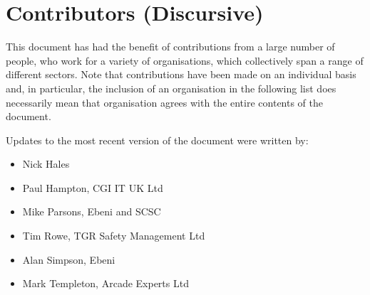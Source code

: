 %
%
\section{Contributors (Discursive)} \label{bkm:contributors}


This document has had the benefit of contributions from a large number of people, who work for a variety of organisations, which collectively span a range of different sectors. Note that contributions  have been made on an individual basis and, in particular, the inclusion of an organisation in the following list does  necessarily mean that organisation agrees with the entire contents of the document.

Updates to the most recent version of the document were written by:
\begin{itemize}
  \item Nick Hales
  \item Paul Hampton, CGI IT UK Ltd
  \item \cbstart Mike Parsons, Ebeni and SCSC
  \item Tim Rowe, TGR Safety Management Ltd
  \item Alan Simpson, Ebeni\cbend
  \item Mark Templeton, Arcade Experts Ltd
\end{itemize}

  
